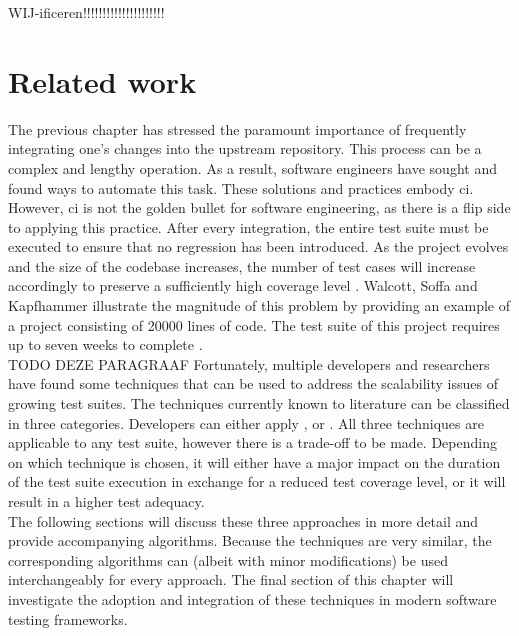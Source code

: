 
WIJ-ificeren!!!!!!!!!!!!!!!!!!!!!

\chapter{Related work}
\label{ch:related-work}
The previous chapter has stressed the paramount importance of frequently integrating one's changes into the upstream repository. This process can be a complex and lengthy operation. As a result, software engineers have sought and found ways to automate this task. These solutions and practices embody \acrfull{ci}. However, \acrshort{ci} is not the golden bullet for software engineering, as there is a flip side to applying this practice. After every integration, the entire test suite must be executed to ensure that no regression has been introduced. As the project evolves and the size of the codebase increases, the number of test cases will increase accordingly to preserve a sufficiently high coverage level \cite{evaluationoftestsuiteminimization}. Walcott, Soffa and Kapfhammer illustrate the magnitude of this problem by providing an example of a project consisting of \SI{20000}{} lines of code. The test suite of this project requires up to seven weeks to complete \cite{10.1145/1146238.1146240}.\\

TODO DEZE PARAGRAAF
\noindent Fortunately, multiple developers and researchers have found some techniques that can be used to address the scalability issues of growing test suites. The techniques currently known to literature can be classified in three categories. Developers can either apply \emph{\tsm{}}, \emph{\tcs{}} or \emph{\tcp{}} \cite{evaluationoftestsuiteminimization}. All three techniques are applicable to any test suite, however there is a trade-off to be made. Depending on which technique is chosen, it will either have a major impact on the duration of the test suite execution in exchange for a reduced test coverage level, or it will result in a higher test adequacy.\\

\noindent The following sections will discuss these three approaches in more detail and provide accompanying algorithms. Because the techniques are very similar, the corresponding algorithms can (albeit with minor modifications) be used interchangeably for every approach. The final section of this chapter will investigate the adoption and integration of these techniques in modern software testing frameworks.


\newpage

\newpage
